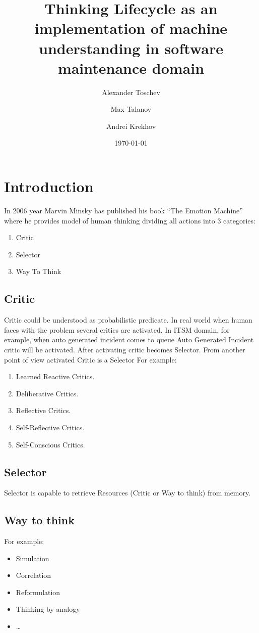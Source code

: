 \documentclass[12pt]{article}
\title{Thinking Lifecycle as an implementation of machine understanding in software maintenance domain}
\author{Alexander Toschev}
\author{Max Talanov}
\author{Andrei Krekhov}
\date{\today}
\begin{document}
\maketitle

\section{Introduction}
In 2006 year Marvin Minsky has published his book “The Emotion Machine” where he provides model of human thinking dividing all actions into 3 categories:

\begin{enumerate}
 \item Critic
 \item Selector
 \item Way To Think
\end{enumerate}

\subsection{Critic}
Critic could be understood as probabilistic predicate. In real world when human faces with the problem several critics are activated. In ITSM domain, for example, when auto generated incident comes to queue Auto Generated Incident critic will be activated. After activating critic becomes Selector. From another point of view activated Critic is a Selector
For example:

\begin{enumerate}
 \item Learned Reactive Critics.
 \item Deliberative Critics.
 \item Reflective Critics.
 \item Self-Reflective Critics.
 \item Self-Conscious Critics.
\end{enumerate}

\subsection{Selector}
Selector is capable to retrieve Resources (Critic or Way to think) from memory.

\subsection{Way to think}

For example:
\begin{itemize}
 \item Simulation
 \item Correlation
 \item Reformulation
 \item Thinking by analogy
 \item …
\end{itemize}
\end{document}
